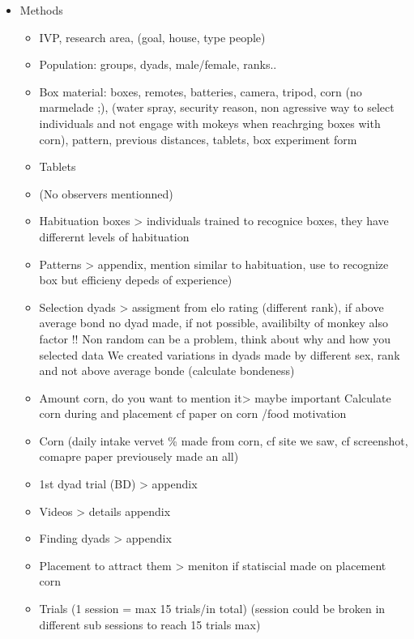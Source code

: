 \documentclass[
]{article}
\begin{document}
\begin{itemize}
\item
  Methods

  \begin{itemize}
  \item
    IVP, research area, (goal, house, type people)
  \item
    Population: groups, dyads, male/female, ranks..
  \item
    Box material: boxes, remotes, batteries, camera, tripod, corn (no
    marmelade ;), (water spray, security reason, non agressive way to
    select individuals and not engage with mokeys when reachrging boxes
    with corn), pattern, previous distances, tablets, box experiment
    form
  \item
    Tablets
  \item
    (No observers mentionned)
  \item
    Habituation boxes \textgreater{} individuals trained to recognice
    boxes, they have differernt levels of habituation
  \item
    Patterns \textgreater{} appendix, mention similar to habituation,
    use to recognize box but efficieny depeds of experience)
  \item
    Selection dyads \textgreater{} assigment from elo rating (different
    rank), if above average bond no dyad made, if not possible,
    availibilty of monkey also factor !! Non random can be a problem,
    think about why and how you selected data We created variations in
    dyads made by different sex, rank and not above average bonde
    (calculate bondeness)
  \item
    Amount corn, do you want to mention it\textgreater{} maybe important
    Calculate corn during and placement cf paper on corn /food
    motivation
  \item
    Corn (daily intake vervet \% made from corn, cf site we saw, cf
    screenshot, comapre paper previousely made an all)
  \item
    1st dyad trial (BD) \textgreater{} appendix
  \item
    Videos \textgreater{} details appendix
  \item
    Finding dyads \textgreater{} appendix
  \item
    Placement to attract them \textgreater{} meniton if statiscial made
    on placement corn
  \item
    Trials (1 session = max 15 trials/in total) (session could be broken
    in different sub sessions to reach 15 trials max)

\end{itemize}
\end{itemize}
\end{document}
